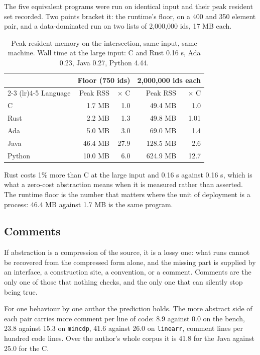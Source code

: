 \documentclass[11pt,a4paper]{article}
\begin{document}
The five equivalent programs were run on identical input and their peak resident set recorded. Two points bracket it: the runtime's floor, on a 400 and 350 element pair, and a data-dominated run on two lists of 2,000,000 ids, 17 MB each.

\begin{table}[H]
\centering
\small
\begin{tabular}{lrrrr}
\toprule
& \multicolumn{2}{c}{Floor (750 ids)} & \multicolumn{2}{c}{2,000,000 ids each} \\
\cmidrule(lr){2-3} \cmidrule(lr){4-5}
Language & Peak RSS & $\times$ C & Peak RSS & $\times$ C \\
\midrule
C & 1.7 MB & 1.0 & 49.4 MB & 1.0 \\
Rust & 2.2 MB & 1.3 & 49.8 MB & 1.01 \\
Ada & 5.0 MB & 3.0 & 69.0 MB & 1.4 \\
Java & 46.4 MB & 27.9 & 128.5 MB & 2.6 \\
Python & 10.0 MB & 6.0 & 624.9 MB & 12.7 \\
\bottomrule
\end{tabular}
\caption{Peak resident memory on the intersection, same input, same machine. Wall time at the large input: C and Rust 0.16 s, Ada 0.23, Java 0.27, Python 4.44.}
\label{tab:mem}
\end{table}

Rust costs 1\% more than C at the large input and 0.16 s against 0.16 s, which is what a zero-cost abstraction means when it is measured rather than asserted. The runtime floor is the number that matters where the unit of deployment is a process: 46.4 MB against 1.7 MB is the same program.

\subsection{Comments}

If abstraction is a compression of the source, it is a lossy one: what runs cannot be recovered from the compressed form alone, and the missing part is supplied by an interface, a construction site, a convention, or a comment. Comments are the only one of those that nothing checks, and the only one that can silently stop being true.

For one behaviour by one author the prediction holds. The more abstract side of each pair carries more comment per line of code: 8.9 against 0.0 on the bench, 23.8 against 15.3 on \texttt{mincdp}, 41.6 against 26.0 on \texttt{linearr}, comment lines per hundred code lines. Over the author's whole corpus it is 41.8 for the Java against 25.0 for the C.
\end{document}
